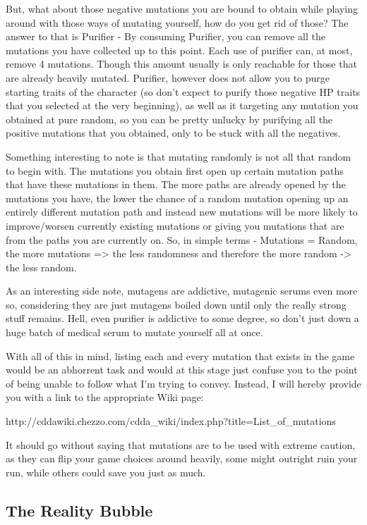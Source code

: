 But, what about those negative mutations you are bound to obtain while playing around with those ways of mutating yourself, how do you get rid of those? The answer to that is Purifier - By consuming Purifier, you can remove all the mutations you have collected up to this point. Each use of purifier can, at most, remove 4 mutations. Though this amount usually is only reachable for those that are already heavily mutated. Purifier, however does not allow you to purge starting traits of the character (so don't expect to purify those negative HP traits that you selected at the very beginning), as well as it targeting any mutation you obtained at pure random, so you can be pretty unlucky by purifying all the positive mutations that you obtained, only to be stuck with all the negatives.

Something interesting to note is that mutating randomly is not all that random to begin with. The mutations you obtain first open up certain mutation paths that have these mutations in them. The more paths are already opened by the mutations you have, the lower the chance of a random mutation opening up an entirely different mutation path and instead new mutations will be more likely to improve/worsen currently existing mutations or giving you mutations that are from the paths you are currently on. So, in simple terms - Mutations = Random, the more mutations => the less randomness and therefore the more random -> the less random.

As an interesting side note, mutagens are addictive, mutagenic serums even more so, considering they are just mutagens boiled down until only the really strong stuff remains. Hell, even purifier is addictive to some degree, so don't just down a huge batch of medical serum to mutate yourself all at once.

With all of this in mind, listing each and every mutation that exists in the game would be an abhorrent task and would at this stage just confuse you to the point of being unable to follow what I'm trying to convey. Instead, I will hereby provide you with a link to the appropriate Wiki page:

http://cddawiki.chezzo.com/cdda\_wiki/index.php?title=List\_of\_mutations

It should go without saying that mutations are to be used with extreme caution, as they can flip your game choices around heavily, some might outright ruin your run, while others could save you just as much.

\subsection{The Reality Bubble}

